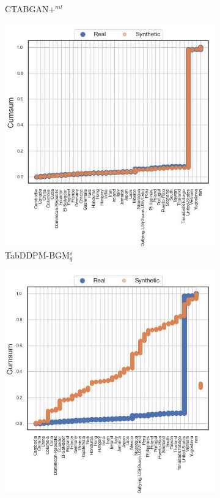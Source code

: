 \begin{figure}[h]
\begin{subfigure}{0.23\textwidth}
		\caption{CTABGAN+$^{ml}$}
	\end{subfigure}
	\begin{subfigure}{0.23\textwidth}
		\centering
		\includegraphics[width=\textwidth]{images/cdf/tab-ddpm-bgm-simTune.jpg}
		\caption{TabDDPM-BGM$^{s}_q$}
	\end{subfigure}
	\begin{subfigure}{0.23\textwidth}
		\centering
		\includegraphics[width=\textwidth]{images/cdf/tab-ddpm-ft.jpg}

\end{subfigure}
\end{figure}
